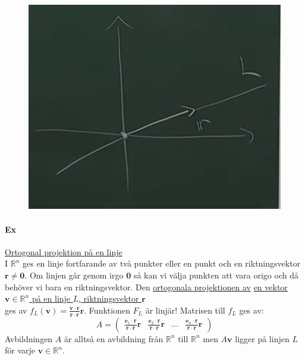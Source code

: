 \begin{figure}
    \centering
    \includegraphics[scale=0.2]{imgs/img01.png}
\end{figure}
\paragraph{Ex} \underline{Ortogonal projektion på en linje}\\
I $\mathbb{R}^{n}$ ges en linje fortfarande av två punkter eller en punkt och en riktningsvektor $\bm{r}\neq \bm{0}$.
Om linjen går genom irgo $\bm{0}$ så kan vi välja punkten att vara origo och då behöver vi bara en riktningsvektor.
Den \underline{ortogonala projektionen av}
\underline{en vektor $\bm{v}\in \mathbb{R}^{n}$ på en linje $L$, riktningsvektor $\bm{r}$}\\
ges av $f_{L}(\bm{v})=\frac{\bm{v}\cdot \bm{r}}{\bm{r}\cdot \bm{r}}\bm{r}$.
Funktionen $F_{L}$ är linjär!
Matrisen till $f_{L}$ ges av: 
\begin{equation*}
    A=\begin{pmatrix}
        \frac{\bm{e}_{1}\cdot\bm{r}}{\bm{r}\cdot\bm{r}}\bm{r} & \frac{\bm{e}_{2}\cdot\bm{r}}{\bm{r}\cdot\bm{r}}\bm{r} & \ldots & \frac{\bm{e}_{n}\cdot\bm{r}}{\bm{r}\cdot\bm{r}}\bm{r}
    \end{pmatrix}
\end{equation*}
Avbildningen $A$ är alltså en avbildning från $\mathbb{R}^{n}$ till $\mathbb{R}^{n}$ men $A\bm{v}$ ligger på linjen $L$ för varje $\bm{v}\in\mathbb{R}^{n}$.

